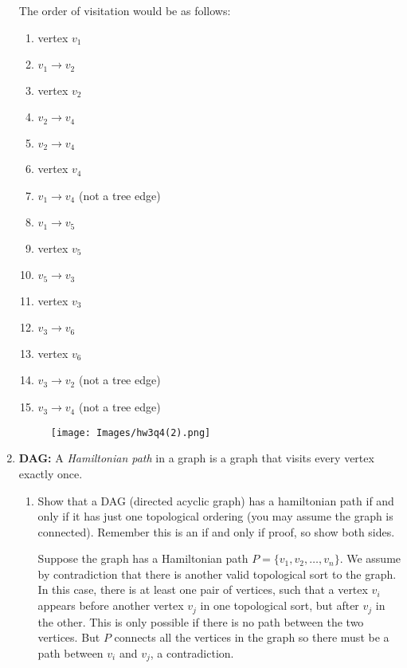 \documentclass[letterpaper, 11pt]{article}
\begin{document}
\begin{enumerate}
    The order of visitation would be as follows:
    \begin{enumerate}[label={\arabic*}.]
        \item vertex $v_1$
        \item $v_1 \to v_2$
        \item vertex $v_2$
        \item $v_2 \to v_4$
        \item $v_2 \to v_4$
        \item vertex $v_4$
        \item $v_1 \to v_4$ (not a tree edge)
        \item $v_1 \to v_5$
        \item vertex $v_5$
        \item $v_5 \to v_3$
        \item vertex $v_3$
        \item $v_3 \to v_6$
        \item vertex $v_6$
        \item $v_3 \to v_2$ (not a tree edge)
        \item $v_3 \to v_4$ (not a tree edge)
    \end{enumerate}

    \begin{figure}[H]
        \centering
        \texttt{[image: Images/hw3q4(2).png]}
    \end{figure}

    \item \textbf{DAG:} A \textit{Hamiltonian path} in a graph is a graph that visits every vertex exactly once.

    \begin{enumerate}
        \item Show that a DAG (directed acyclic graph) has a hamiltonian path if and only if it has just one topological ordering (you may assume the graph is connected). Remember this is an if and only if proof, so show both sides.

        Suppose the graph has a Hamiltonian path $P = \{v_1, v_2,\ldots, v_n\}$. We assume by contradiction that there is another valid topological sort to the graph. In this case, there is at least one pair of vertices, such that a vertex $v_i$  appears before another vertex $v_j$ in one topological sort, but after $v_j$ in the other. This is only possible if there is no path between the two vertices. But $P$ connects all the vertices in the graph so there must be a path between $v_i$ and $v_j$, a contradiction.


\end{enumerate}
\end{enumerate}
\end{document}
